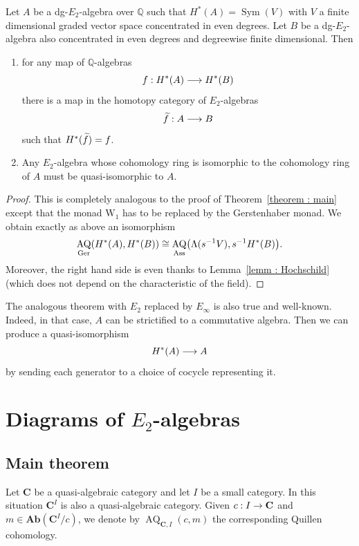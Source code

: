 \documentclass[AHL,Unicode,longabstracts,published]{cedram}
\DeclareMathOperator{\Ass}{Ass}
\DeclareMathOperator{\AQ}{AQ}
\DeclareMathOperator{\sym}{Sym}
\DeclareMathOperator{\Gerr}{Ger}
\newcommand{\bAb}{\mathbf{Ab}}
\newcommand{\bfC}{\mathbf{C}}
\newcommand{\W}{\mathrm{W}}
\newcommand{\QQ}{\mathbb{Q}}
\renewcommand*{\to}{\mathchoice{\longrightarrow}{\rightarrow}{\rightarrow}{\rightarrow}}
\let\originalleft\left
\let\originalright\right
\renewcommand{\left}{\mathopen{}\mathclose\bgroup\originalleft}
\renewcommand{\right}{\aftergroup\egroup\originalright}
\let\oldtilde\tilde
\renewcommand*{\tilde}[1]{\mathchoice{\widetilde{#1}}{\widetilde{#1}}{\oldtilde{#1}}{\oldtilde{#1}}}
\begin{document}
\begin{theo}\label{theorem : main char zero}
Let $A$ be a dg-$E_2$-algebra over $\QQ$ such that $H^*(A)=\sym(V)$ with $V$ a finite dimensional graded vector space concentrated in even degrees. Let $B$ be a dg-$E_2$-algebra also concentrated in even degrees and degreewise finite dimensional. Then
\begin{enumerate}
\item\label{theo4.11.1} for any map of $\QQ$-algebras
\[
f: H^*(A)\to H^*(B)
\]
there is a map in the homotopy category of $E_2$-algebras
\[
\tilde{f}: A\to B
\]
such that $H^*(\tilde{f})=f$.
\item\label{theo4.11.2} Any $E_2$-algebra whose cohomology ring is isomorphic to the cohomology ring of $A$ must be quasi-isomorphic to $A$.
\end{enumerate}
\end{theo}

\begin{proof}
This is completely analogous to the proof of Theorem~\ref{theorem : main} except that the monad $\W_1$ has to be replaced by the Gerstenhaber monad. We obtain exactly as above an isomorphism
\[
\AQ_{\Gerr}(H^*(A),H^*(B))\cong\AQ_{\Ass}\left(\Lambda(s^{-1}V),s^{-1}H^*(B)\right).
\]
Moreover, the right hand side is even thanks to Lemma~\ref{lemm : Hochschild} (which does not depend on the characteristic of the field).
\end{proof}

\begin{rema}
The analogous theorem with $E_2$ replaced by $E_\infty$ is also true and well-known. Indeed, in that case, $A$ can be strictified to a commutative algebra. Then we can produce a quasi-isomorphism
\[
H^*(A)\to A
\]
by sending each generator to a choice of cocycle representing it.
\end{rema}

\section{Diagrams of \texorpdfstring{$E_2$}{E\_2}-algebras}

\subsection{Main theorem}

Let $\bfC$ be a quasi-algebraic category and let $I$ be a small category. In this situation $\bfC^I$ is also a quasi-algebraic category. Given $c: I\to\bfC$ and $m\in\bAb(\bfC^I/c)$, we denote by $\AQ_{\bfC,I}(c,m)$ the corresponding Quillen cohomology.
\end{document}
